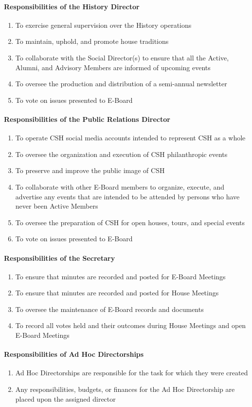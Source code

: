 \documentclass{article}
\newcommand{\asubsubsection}[1]{\paragraph{#1} \label{#1}}
\begin{document}
\asubsubsection{Responsibilities of the History Director}
\begin{enumerate}
	\item To exercise general supervision over the History operations
	\item To maintain, uphold, and promote house traditions
	\item To collaborate with the Social Director(s) to ensure that all the Active, Alumni, and Advisory Members are informed of upcoming events
	\item To oversee the production and distribution of a semi-annual newsletter
	\item To vote on issues presented to E-Board
\end{enumerate}

\asubsubsection{Responsibilities of the Public Relations Director}
\begin{enumerate}
	\item To operate CSH social media accounts intended to represent CSH as a whole
	\item To oversee the organization and execution of CSH philanthropic events
	\item To preserve and improve the public image of CSH
	\item To collaborate with other E-Board members to organize, execute, and advertise any events that are intended to be attended by persons who have never been Active Members
	\item To oversee the preparation of CSH for open houses, tours, and special events
	\item To vote on issues presented to E-Board
\end{enumerate}

\asubsubsection{Responsibilities of the Secretary}
\begin{enumerate}
	\item To ensure that minutes are recorded and posted for E-Board Meetings
	\item To ensure that minutes are recorded and posted for House Meetings
	\item To oversee the maintenance of E-Board records and documents
	\item To record all votes held and their outcomes during House Meetings and open E-Board Meetings
\end{enumerate}

\asubsubsection{Responsibilities of Ad Hoc Directorships}
\begin{enumerate}
	\item Ad Hoc Directorships are responsible for the task for which they were created
	\item Any responsibilities, budgets, or finances for the Ad Hoc Directorship are placed upon the assigned director
\end{enumerate}
\end{document}
